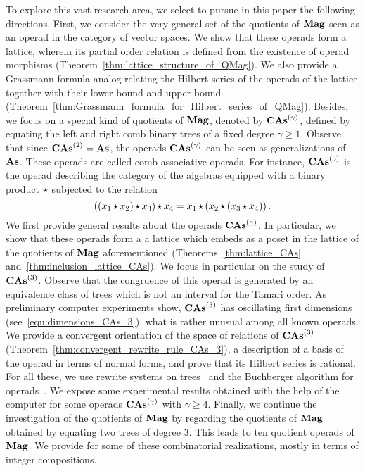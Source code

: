 To explore this vast research area, we select to pursue in this paper
the following directions. First, we consider the very general set of the
quotients of $\mathbf{Mag}$ seen as an operad in the category of vector spaces.
We show that these operads form a lattice, wherein its partial order
relation is defined from the existence of operad morphisms
(Theorem~\ref{thm:lattice_structure_of_QMag}). We also provide a
Grassmann formula analog relating the Hilbert series of the operads of
the lattice together with their lower-bound and upper-bound
(Theorem~\ref{thm:Grassmann_formula_for_Hilbert_series_of_QMag}).
Besides, we focus on a special kind of quotients of $\mathbf{Mag}$, denoted by
$\mathbf{CAs}^{\left(\gamma\right)}$, defined by equating the left and right comb binary trees
of a fixed degree $\gamma \geq 1$.
Observe that since $\mathbf{CAs}^{\left(2\right)}=\mathbf{As}$, the operads $\mathbf{CAs}^{\left(\gamma\right)}$ can be seen
as generalizations of $\mathbf{As}$. These operads are called comb
associative operads. For instance, $\mathbf{CAs}^{\left(3\right)}$ is the operad describing
the category of the algebras equipped with a binary product $\operatorname{\star}$
subjected to the relation
\begin{equation}
    \left(\left(x_1 \operatorname{\star} x_2\right) \operatorname{\star} x_3\right) \operatorname{\star} x_4
    =
    x_1 \operatorname{\star} \left(x_2 \operatorname{\star} \left(x_3 \operatorname{\star} x_4\right)\right).
\end{equation}
We first provide general results about the
operads $\mathbf{CAs}^{\left(\gamma\right)}$. In particular, we show that these operads form a
a lattice which embeds as a poset in the lattice of the quotients of
$\mathbf{Mag}$ aforementioned
(Theorems~\ref{thm:lattice_CAs} and~\ref{thm:inclusion_lattice_CAs}). We
focus in particular on the study of $\mathbf{CAs}^{\left(3\right)}$. Observe that the
congruence of this operad is generated by an equivalence class of trees
which is not an interval for the Tamari order. As preliminary computer
experiments show, $\mathbf{CAs}^{\left(3\right)}$ has oscillating first dimensions
(see~\eqref{equ:dimensions_CAs_3}), what is rather unusual among all
known operads. We provide a convergent orientation of the space of
relations of $\mathbf{CAs}^{\left(3\right)}$ (Theorem~\ref{thm:convergent_rewrite_rule_CAs_3}),
a description of a basis of the operad in terms of normal forms, and
prove that its Hilbert series is rational. For all these, we use rewrite
systems on trees~\cite{BN98} and the Buchberger algorithm for
operads~\cite{DK10}. We expose some experimental results obtained with
the help of the computer for some operads $\mathbf{CAs}^{\left(\gamma\right)}$ with
$\gamma \geq 4$. Finally, we continue the
investigation of the quotients of $\mathbf{Mag}$ by regarding the quotients of
$\mathbf{Mag}$ obtained by equating two trees of degree $3$. This leads to ten
quotient operads of $\mathbf{Mag}$. We provide for some of these combinatorial
realizations, mostly in terms of integer compositions.
\medbreak

